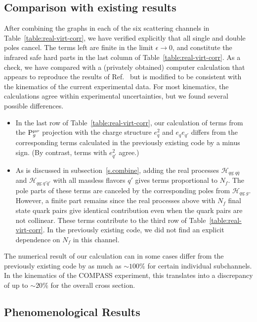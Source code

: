 \documentclass[prd,preprintnumbers,nofootinbib,superscriptaddress,onecolumn,preprint]{revtex4-1}
\newcommand\3[1]{\boldsymbol{#1}}
\newcommand{\contractortot}[1]{\ensuremath{{\rm P}}_{#1}}
\newcommand{\hard}{\ensuremath{\mathcal{H}}}
\begin{document}
\subsection{Comparison with existing results}
\label{s.compare}
After combining the graphs in each of the six
scattering channels in Table~\ref{table:real-virt-corr}, we have
verified explicitly that all single and double poles cancel. The terms left are
finite in the limit $\epsilon \rightarrow 0$, and constitute the infrared
safe hard parts in the last column of
Table~\ref{table:real-virt-corr}. As a check, we have
compared with a (privately obtained) computer calculation that appears
to reproduce the results of Ref.~\cite{Daleo:2004pn} but is modified
to be consistent with the kinematics of the current experimental data.
For most kinematics, the calculations agree within experimental 
uncertainties, but we found several possible differences.
\begin{itemize}
	\item In the last row of Table~\ref{table:real-virt-corr}, our calculation of
	terms from the $\contractortot{g}^{\mu\nu}$ projection with the charge structure 
	$e_q^2$ and $e_qe_{q'}$ differs from
	the corresponding terms calculated in the previously existing code by a minus sign. 
	(By contrast, terms with
	$e_{q'}^2$ agree.) 
\item As is discussed in subsection~\ref{s.combine}, adding the real processes
     $\hard_{qq;q\bar{q}}$ and $\hard_{qq;q'\bar{q}'}$ with all massless flavors $q'$
	 gives terms proportional to $N_f$. The pole parts of these terms are canceled by 
	 the corresponding poles from $\hard_{qq;g}$. However, a finite part remains since
	 the real processes above with $N_f$ final state quark pairs give identical 
	 contribution even when the 
	 quark pairs are not collinear. These terms contribute to the third row 
		of 
	 Table~\ref{table:real-virt-corr}. In the previously existing code,
	 we did not find an explicit dependence on $N_f$ in this channel.
% 	 
\end{itemize}
The numerical result of our calculation can in some cases differ from 
the previously existing code by as much as $\sim 100\%$ for 
certain individual subchannels. In the kinematics of the COMPASS 
experiment, 
this translates into a discrepancy of up to $\sim 20\%$ for the overall cross section. 

\subsection{Phenomenological Results}
\label{s.Pheno}
\end{document}
